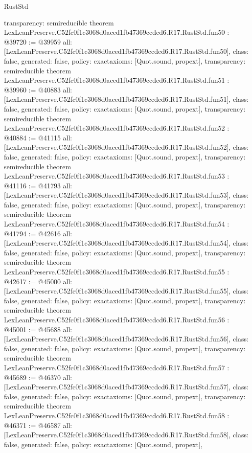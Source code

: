 \begin{lexlean}{RustStd}
\begin{coremodule}
{  transparency: semireducible
}
theorem LexLeanPreserve.C52fc0f1c3068d0aced1fb47369ccdcd6.R17.RustStd.fun50 : @39720 := @39959 {
  all: [LexLeanPreserve.C52fc0f1c3068d0aced1fb47369ccdcd6.R17.RustStd.fun50],
  class: false,
  generated: false,
  policy: exact{axioms: [Quot.sound, propext]},
  transparency: semireducible
}
theorem LexLeanPreserve.C52fc0f1c3068d0aced1fb47369ccdcd6.R17.RustStd.fun51 : @39960 := @40883 {
  all: [LexLeanPreserve.C52fc0f1c3068d0aced1fb47369ccdcd6.R17.RustStd.fun51],
  class: false,
  generated: false,
  policy: exact{axioms: [Quot.sound, propext]},
  transparency: semireducible
}
theorem LexLeanPreserve.C52fc0f1c3068d0aced1fb47369ccdcd6.R17.RustStd.fun52 : @40884 := @41115 {
  all: [LexLeanPreserve.C52fc0f1c3068d0aced1fb47369ccdcd6.R17.RustStd.fun52],
  class: false,
  generated: false,
  policy: exact{axioms: [Quot.sound, propext]},
  transparency: semireducible
}
theorem LexLeanPreserve.C52fc0f1c3068d0aced1fb47369ccdcd6.R17.RustStd.fun53 : @41116 := @41793 {
  all: [LexLeanPreserve.C52fc0f1c3068d0aced1fb47369ccdcd6.R17.RustStd.fun53],
  class: false,
  generated: false,
  policy: exact{axioms: [Quot.sound, propext]},
  transparency: semireducible
}
theorem LexLeanPreserve.C52fc0f1c3068d0aced1fb47369ccdcd6.R17.RustStd.fun54 : @41794 := @42616 {
  all: [LexLeanPreserve.C52fc0f1c3068d0aced1fb47369ccdcd6.R17.RustStd.fun54],
  class: false,
  generated: false,
  policy: exact{axioms: [Quot.sound, propext]},
  transparency: semireducible
}
theorem LexLeanPreserve.C52fc0f1c3068d0aced1fb47369ccdcd6.R17.RustStd.fun55 : @42617 := @45000 {
  all: [LexLeanPreserve.C52fc0f1c3068d0aced1fb47369ccdcd6.R17.RustStd.fun55],
  class: false,
  generated: false,
  policy: exact{axioms: [Quot.sound, propext]},
  transparency: semireducible
}
theorem LexLeanPreserve.C52fc0f1c3068d0aced1fb47369ccdcd6.R17.RustStd.fun56 : @45001 := @45688 {
  all: [LexLeanPreserve.C52fc0f1c3068d0aced1fb47369ccdcd6.R17.RustStd.fun56],
  class: false,
  generated: false,
  policy: exact{axioms: [Quot.sound, propext]},
  transparency: semireducible
}
theorem LexLeanPreserve.C52fc0f1c3068d0aced1fb47369ccdcd6.R17.RustStd.fun57 : @45689 := @46370 {
  all: [LexLeanPreserve.C52fc0f1c3068d0aced1fb47369ccdcd6.R17.RustStd.fun57],
  class: false,
  generated: false,
  policy: exact{axioms: [Quot.sound, propext]},
  transparency: semireducible
}
theorem LexLeanPreserve.C52fc0f1c3068d0aced1fb47369ccdcd6.R17.RustStd.fun58 : @46371 := @46587 {
  all: [LexLeanPreserve.C52fc0f1c3068d0aced1fb47369ccdcd6.R17.RustStd.fun58],
  class: false,
  generated: false,
  policy: exact{axioms: [Quot.sound, propext]},
}
\end{coremodule}
\end{lexlean}
